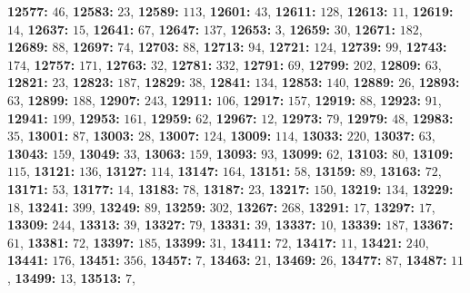 \textsf{\bfseries 12577:} $46$, \textsf{\bfseries 12583:} $23$, \textsf{\bfseries 12589:} $113$, \textsf{\bfseries 12601:} $43$, \textsf{\bfseries 12611:} $128$, \textsf{\bfseries 12613:} $11$, \textsf{\bfseries 12619:} $14$, \textsf{\bfseries 12637:} $15$, \textsf{\bfseries 12641:} $67$, \textsf{\bfseries 12647:} $137$, \textsf{\bfseries 12653:} $3$, \textsf{\bfseries 12659:} $30$, \textsf{\bfseries 12671:} $182$, \textsf{\bfseries 12689:} $88$, \textsf{\bfseries 12697:} $74$, \textsf{\bfseries 12703:} $88$, \textsf{\bfseries 12713:} $94$, \textsf{\bfseries 12721:} $124$, \textsf{\bfseries 12739:} $99$, \textsf{\bfseries 12743:} $174$, \textsf{\bfseries 12757:} $171$, \textsf{\bfseries 12763:} $32$, \textsf{\bfseries 12781:} $332$, \textsf{\bfseries 12791:} $69$, \textsf{\bfseries 12799:} $202$, \textsf{\bfseries 12809:} $63$, \textsf{\bfseries 12821:} $23$, \textsf{\bfseries 12823:} $187$, \textsf{\bfseries 12829:} $38$, \textsf{\bfseries 12841:} $134$, \textsf{\bfseries 12853:} $140$, \textsf{\bfseries 12889:} $26$, \textsf{\bfseries 12893:} $63$, \textsf{\bfseries 12899:} $188$, \textsf{\bfseries 12907:} $243$, \textsf{\bfseries 12911:} $106$, \textsf{\bfseries 12917:} $157$, \textsf{\bfseries 12919:} $88$, \textsf{\bfseries 12923:} $91$, \textsf{\bfseries 12941:} $199$, \textsf{\bfseries 12953:} $161$, \textsf{\bfseries 12959:} $62$, \textsf{\bfseries 12967:} $12$, \textsf{\bfseries 12973:} $79$, \textsf{\bfseries 12979:} $48$, \textsf{\bfseries 12983:} $35$, \textsf{\bfseries 13001:} $87$, \textsf{\bfseries 13003:} $28$, \textsf{\bfseries 13007:} $124$, \textsf{\bfseries 13009:} $114$, \textsf{\bfseries 13033:} $220$, \textsf{\bfseries 13037:} $63$, \textsf{\bfseries 13043:} $159$, \textsf{\bfseries 13049:} $33$, \textsf{\bfseries 13063:} $159$, \textsf{\bfseries 13093:} $93$, \textsf{\bfseries 13099:} $62$, \textsf{\bfseries 13103:} $80$, \textsf{\bfseries 13109:} $115$, \textsf{\bfseries 13121:} $136$, \textsf{\bfseries 13127:} $114$, \textsf{\bfseries 13147:} $164$, \textsf{\bfseries 13151:} $58$, \textsf{\bfseries 13159:} $89$, \textsf{\bfseries 13163:} $72$, \textsf{\bfseries 13171:} $53$, \textsf{\bfseries 13177:} $14$, \textsf{\bfseries 13183:} $78$, \textsf{\bfseries 13187:} $23$, \textsf{\bfseries 13217:} $150$, \textsf{\bfseries 13219:} $134$, \textsf{\bfseries 13229:} $18$, \textsf{\bfseries 13241:} $399$, \textsf{\bfseries 13249:} $89$, \textsf{\bfseries 13259:} $302$, \textsf{\bfseries 13267:} $268$, \textsf{\bfseries 13291:} $17$, \textsf{\bfseries 13297:} $17$, \textsf{\bfseries 13309:} $244$, \textsf{\bfseries 13313:} $39$, \textsf{\bfseries 13327:} $79$, \textsf{\bfseries 13331:} $39$, \textsf{\bfseries 13337:} $10$, \textsf{\bfseries 13339:} $187$, \textsf{\bfseries 13367:} $61$, \textsf{\bfseries 13381:} $72$, \textsf{\bfseries 13397:} $185$, \textsf{\bfseries 13399:} $31$, \textsf{\bfseries 13411:} $72$, \textsf{\bfseries 13417:} $11$, \textsf{\bfseries 13421:} $240$, \textsf{\bfseries 13441:} $176$, \textsf{\bfseries 13451:} $356$, \textsf{\bfseries 13457:} $7$, \textsf{\bfseries 13463:} $21$, \textsf{\bfseries 13469:} $26$, \textsf{\bfseries 13477:} $87$, \textsf{\bfseries 13487:} $11$, \textsf{\bfseries 13499:} $13$, \textsf{\bfseries 13513:} $7$, 
